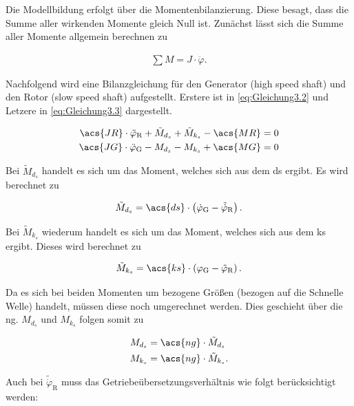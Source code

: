 Die Modellbildung erfolgt über die Momentenbilanzierung. Diese besagt, dass die Summe aller wirkenden Momente gleich Null ist. Zunächst lässt sich die Summe aller Momente allgemein berechnen zu

\begin{align}
    \sum M = J \cdot \ddot\varphi.
    \label{eq:Gleichung3.1}
\end{align}

Nachfolgend wird eine Bilanzgleichung für den Generator (high speed shaft) und den Rotor (slow speed shaft) aufgestellt. Erstere ist in \autoref{eq:Gleichung3.2} und Letzere in \autoref{eq:Gleichung3.3} dargestellt.

\begin{align}
    \label{eq:Gleichung3.2}
   \acs{JR} \cdot \ddot{\varphi}_{\mathrm{R}} + \tilde{M}_{d_s} + \tilde{M}_{k_s} - \acs{MR} &= 0 \\
   \label{eq:Gleichung3.3}
   \acs{JG} \cdot \ddot{\varphi}_{\mathrm{G}} - {M}_{d_s} - {M}_{k_s} + \acs{MG} &= 0
\end{align}

Bei $\tilde{M}_{d_s}$ handelt es sich um das Moment, welches sich aus dem \ac{ds} ergibt. Es wird berechnet zu

\begin{align}
   \tilde{M}_{d_s} = \acs{ds} \cdot \left( \dot\varphi_{\mathrm{G}} - \tilde{\dot\varphi}_{\mathrm{R}}\right).
   \label{eq:Gleichung3.4}
\end{align}

Bei $\tilde{M}_{k_s}$ wiederum handelt es sich um das Moment, welches sich aus dem \ac{ks} ergibt. Dieses wird berechnet zu

\begin{align}
   \tilde{M}_{k_s} = \acs{ks} \cdot \left( \varphi_{\mathrm{G}} - \tilde{\varphi}_{\mathrm{R}}\right).
   \label{eq:Gleichung3.5}
\end{align}

Da es sich bei beiden Momenten um bezogene Größen (bezogen auf die Schnelle Welle) handelt, müssen diese noch umgerechnet werden. Dies geschieht über die \ac{ng}. $M_{d_s}$ und $M_{k_s}$ folgen somit zu

\begin{align}
    \label{eq:Gleichung3.6}
   M_{d_s} &= \acs{ng} \cdot \tilde{M}_{d_s} \\
   \label{eq:Gleichung3.7}
   M_{k_s} &= \acs{ng} \cdot \tilde{M}_{k_s}.
\end{align}

Auch bei $\tilde{\dot\varphi}_{\mathrm{R}}$ muss das Getriebeübersetzungsverhältnis wie folgt berücksichtigt werden:

